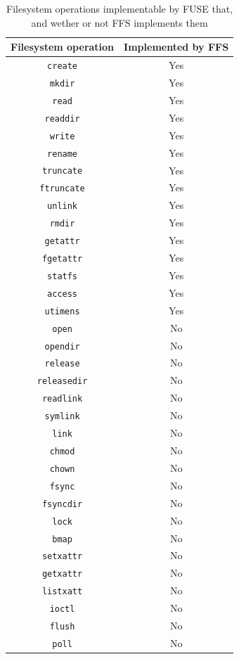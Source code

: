 \begin{table}[!ht]
	\begin{center}
		\caption{Filesystem operations implementable by FUSE that, and wether or not FFS implements them}
		\begin{tabular}{| c | c |}
			
			\hline
			\textbf{Filesystem operation} 	& \textbf{Implemented by FFS}\\
			\hline
			\hline
			\texttt{create} & Yes\\
			\texttt{mkdir} & Yes\\
			\texttt{read} & Yes\\
			\texttt{readdir} & Yes\\
			\texttt{write} & Yes\\
			\texttt{rename} & Yes\\
			\texttt{truncate} & Yes\\
			\texttt{ftruncate} & Yes\\
			\texttt{unlink} & Yes\\
			\texttt{rmdir} & Yes\\
			\texttt{getattr} & Yes\\
			\texttt{fgetattr} & Yes\\
			\texttt{statfs} & Yes\\
			\texttt{access} & Yes\\
			\texttt{utimens} & Yes\\
			\texttt{open} & No\\
			\texttt{opendir} & No\\
			\texttt{release} & No\\
			\texttt{releasedir} & No\\
			\texttt{readlink} & No\\
			\texttt{symlink} & No\\
			\texttt{link} & No\\
			\texttt{chmod} & No\\
			\texttt{chown} & No\\
			\texttt{fsync} & No\\
			\texttt{fsyncdir} & No\\
			\texttt{lock} & No\\
			\texttt{bmap} & No\\
			\texttt{setxattr} & No\\
			\texttt{getxattr} & No\\
			\texttt{listxatt} & No\\
			\texttt{ioctl} & No\\
			\texttt{flush} & No\\
			\texttt{poll} & No\\
			\hline

		\end{tabular}
		\label{tbl:fs_impl_op}
	\end{center}
\end{table}

